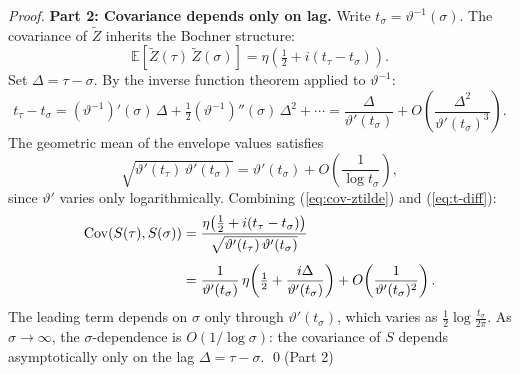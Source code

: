 \documentclass[11pt,a4paper]{article}
\begin{document}
\begin{proof}
\medskip\noindent\textbf{Part 2: Covariance depends only on lag.}
Write $t_\sigma=\vartheta^{-1}(\sigma)$. The covariance of
$\widetilde{Z}$ inherits the Bochner structure:
\begin{equation}
\label{eq:cov-ztilde}
\mathbb{E}[\widetilde{Z}(\tau)\,\widetilde{Z}(\sigma)]
= \eta\!\left(\tfrac{1}{2}+i(t_\tau - t_\sigma)\right).
\end{equation}
Set $\Delta=\tau-\sigma$. By the inverse function theorem applied to
$\vartheta^{-1}$:
\begin{equation}
\label{eq:t-diff}
t_\tau - t_\sigma
= (\vartheta^{-1})'(\sigma)\,\Delta
+ \tfrac{1}{2}(\vartheta^{-1})''(\sigma)\,\Delta^2 + \cdots
= \frac{\Delta}{\vartheta'(t_\sigma)}
+ O\!\left(\frac{\Delta^2}{\vartheta'(t_\sigma)^3}\right).
\end{equation}
The geometric mean of the envelope values satisfies
\begin{equation}
\sqrt{\vartheta'(t_\tau)\,\vartheta'(t_\sigma)}
= \vartheta'(t_\sigma) + O\!\left(\frac{1}{\log t_\sigma}\right),
\end{equation}
since $\vartheta'$ varies only logarithmically. Combining (\ref{eq:cov-ztilde})
and (\ref{eq:t-diff}):
\begin{align}
\label{eq:cov-S}
\operatorname{Cov}(S(\tau),S(\sigma))
&= \frac{\eta\bigl(\tfrac{1}{2}+i(t_\tau-t_\sigma)\bigr)}
{\sqrt{\vartheta'(t_\tau)\,\vartheta'(t_\sigma)}} \notag\\[4pt]
&= \frac{1}{\vartheta'(t_\sigma)}\,
\eta\!\left(\tfrac{1}{2}
+ \frac{i\Delta}{\vartheta'(t_\sigma)}\right)
+ O\!\left(\frac{1}{\vartheta'(t_\sigma)^2}\right).
\end{align}
The leading term depends on $\sigma$ only through $\vartheta'(t_\sigma)$,
which varies as $\tfrac{1}{2}\log\tfrac{t_\sigma}{2\pi}$.
As $\sigma\to\infty$, the $\sigma$-dependence is
$O(1/\log\sigma)$: the covariance of $S$ depends asymptotically only on
the lag $\Delta=\tau-\sigma$. \qed (Part 2)


\end{proof}
\end{document}
